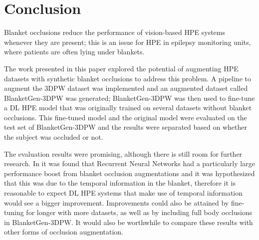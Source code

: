 \documentclass[conference]{IEEEtran}
\begin{document}
\section{Conclusion}
Blanket occlusions reduce the performance of vision-based HPE systems whenever they are present; this is an issue for HPE in epilepsy monitoring units, where patients are often lying under blankets. 

The work presented in this paper explored the potential of augmenting HPE datasets with synthetic blanket occlusions to address this problem. A pipeline to augment the 3DPW dataset was implemented and an augmented dataset called BlanketGen-3DPW was generated; BlanketGen-3DPW was then used to fine-tune a DL HPE model that was originally trained on several datasets without blanket occlusions. This fine-tuned model and the original model were evaluated on the test set of BlanketGen-3DPW and the results were separated based on whether the subject was occluded or not.

The evaluation results were promising, although there is still room for further research. 
In \cite{patientMoCap} it was found that Recurrent Neural Networks had a particularly large performance boost from blanket occlusion augmentations and it was hypothesized that this was due to the temporal information in the blanket, therefore it is reasonable to expect DL HPE systems that make use of temporal information would see a bigger improvement. Improvements could also be attained by fine-tuning for longer with more datasets, as well as by including full body occlusions in BlanketGen-3DPW. It would also be worthwhile to compare these results with other forms of occlusion augmentation.









































































\end{document}
